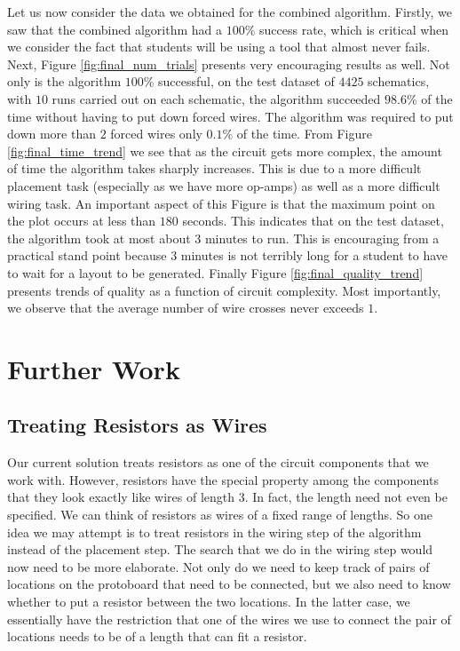 Let us now consider the data we obtained for the combined algorithm. Firstly, we
saw that the combined algorithm had a $100\%$ success rate, which is critical
when we consider the fact that students will be using a tool that almost never fails.
Next, Figure \ref{fig:final_num_trials} presents very encouraging results as well.
Not only is the algorithm $100\%$ successful, on the test dataset of $4425$
schematics, with $10$ runs carried out on each schematic, the algorithm succeeded
$98.6\%$ of the time without having to put down forced wires. The algorithm was
required to put down more than $2$ forced wires only $0.1\%$ of the time.
From Figure
\ref{fig:final_time_trend} we see that as the circuit gets more complex, the
amount of time the algorithm takes sharply increases. This is due to a more
difficult placement task (especially as we have more op-amps) as well as a more
difficult wiring task. An important aspect of this Figure is that the maximum
point on the plot occurs at less than $180$ seconds. This indicates that on the
test dataset, the algorithm took at most about $3$ minutes to run. This is
encouraging from a practical stand point because $3$ minutes is not terribly long
for a student to have to wait for a layout to be generated.
Finally Figure \ref{fig:final_quality_trend} presents trends of quality as a
function of circuit complexity. Most importantly, we observe that the average
number of wire crosses never exceeds $1$.

\section{Further Work}

\subsection{Treating Resistors as Wires}

Our current solution treats resistors as one of the circuit components that we
work with. However, resistors have the special property among the components that
they look exactly like wires of length $3$.
In fact, the length need not even be specified.
We can think of resistors as wires of a fixed range of lengths. So one idea we
may attempt is to treat resistors in the wiring step of the algorithm instead of
the placement step. The search that we do in the wiring step would now need to be
more elaborate. Not only do we need to keep track of pairs of locations on the
protoboard that need to be connected, but we also need to know whether to put
a resistor between the two locations. In the latter case, we essentially have the
restriction that one of the wires we use to connect the pair of locations needs
to be of a length that can fit a resistor.

